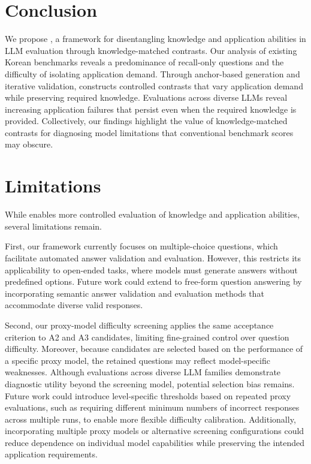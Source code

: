 \section{Conclusion}
We propose \name{}, a framework for disentangling knowledge and application abilities in LLM evaluation through knowledge-matched contrasts.
Our analysis of existing Korean benchmarks reveals a predominance of recall-only questions and the difficulty of isolating application demand.
Through anchor-based generation and iterative validation, \name{} constructs controlled contrasts that vary application demand while preserving required knowledge. 
Evaluations across diverse LLMs reveal increasing application failures that persist even when the required knowledge is provided. 
Collectively, our findings highlight the value of knowledge-matched contrasts for diagnosing model limitations that conventional benchmark scores may obscure.


\newpage
\section*{Limitations} 
While \name{} enables more controlled evaluation of knowledge and application abilities, several limitations remain.

First, our framework currently focuses on multiple-choice questions, which facilitate automated answer validation and evaluation.
However, this restricts its applicability to open-ended tasks, where models must generate answers without predefined options.
Future work could extend \name{} to free-form question answering by incorporating semantic answer validation and evaluation methods that accommodate diverse valid responses.

Second, our proxy-model difficulty screening applies the same acceptance criterion to A2 and A3 candidates, limiting fine-grained control over question difficulty.
Moreover, because candidates are selected based on the performance of a specific proxy model, the retained questions may reflect model-specific weaknesses.
Although evaluations across diverse LLM families demonstrate diagnostic utility beyond the screening model, potential selection bias remains. 
Future work could introduce level-specific thresholds based on repeated proxy evaluations, such as requiring different minimum numbers of incorrect responses across multiple runs, to enable more flexible difficulty calibration.
Additionally, incorporating multiple proxy models or alternative screening configurations could reduce dependence on individual model capabilities while preserving the intended application requirements. 


